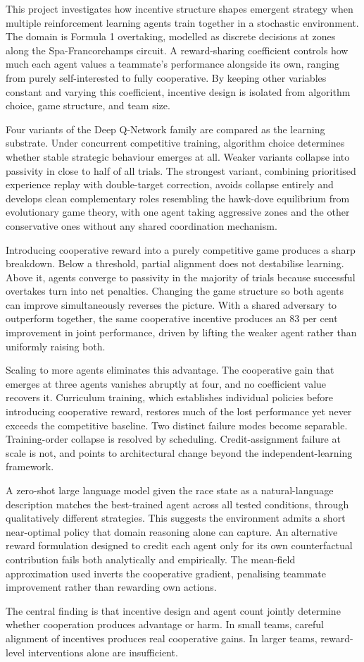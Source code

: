 This project investigates how incentive structure shapes emergent strategy when multiple reinforcement learning agents train together in a stochastic environment. The domain is Formula 1 overtaking, modelled as discrete decisions at zones along the Spa-Francorchamps circuit. A reward-sharing coefficient controls how much each agent values a teammate's performance alongside its own, ranging from purely self-interested to fully cooperative. By keeping other variables constant and varying this coefficient, incentive design is isolated from algorithm choice, game structure, and team size.

Four variants of the Deep Q-Network family are compared as the learning substrate. Under concurrent competitive training, algorithm choice determines whether stable strategic behaviour emerges at all. Weaker variants collapse into passivity in close to half of all trials. The strongest variant, combining prioritised experience replay with double-target correction, avoids collapse entirely and develops clean complementary roles resembling the hawk-dove equilibrium from evolutionary game theory, with one agent taking aggressive zones and the other conservative ones without any shared coordination mechanism.

Introducing cooperative reward into a purely competitive game produces a sharp breakdown. Below a threshold, partial alignment does not destabilise learning. Above it, agents converge to passivity in the majority of trials because successful overtakes turn into net penalties. Changing the game structure so both agents can improve simultaneously reverses the picture. With a shared adversary to outperform together, the same cooperative incentive produces an 83 per cent improvement in joint performance, driven by lifting the weaker agent rather than uniformly raising both.

Scaling to more agents eliminates this advantage. The cooperative gain that emerges at three agents vanishes abruptly at four, and no coefficient value recovers it. Curriculum training, which establishes individual policies before introducing cooperative reward, restores much of the lost performance yet never exceeds the competitive baseline. Two distinct failure modes become separable. Training-order collapse is resolved by scheduling. Credit-assignment failure at scale is not, and points to architectural change beyond the independent-learning framework.

A zero-shot large language model given the race state as a natural-language description matches the best-trained agent across all tested conditions, through qualitatively different strategies. This suggests the environment admits a short near-optimal policy that domain reasoning alone can capture. An alternative reward formulation designed to credit each agent only for its own counterfactual contribution fails both analytically and empirically. The mean-field approximation used inverts the cooperative gradient, penalising teammate improvement rather than rewarding own actions.

The central finding is that incentive design and agent count jointly determine whether cooperation produces advantage or harm. In small teams, careful alignment of incentives produces real cooperative gains. In larger teams, reward-level interventions alone are insufficient.